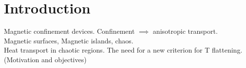 \section{Introduction}
Magnetic confinement devices. Confinement $\implies$ anisotropic transport.\\
Magnetic surfaces, Magnetic islands, chaos.\\
Heat transport in chaotic regions. The need for a new criterion for T flattening. (Motivation and objectives)
